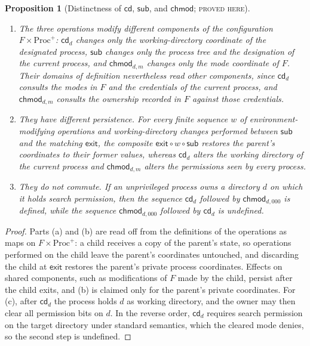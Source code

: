 \documentclass[11pt]{article}
\newtheorem{proposition}[theorem]{Proposition}
\theoremstyle{definition}
\theoremstyle{remark}
\newcommand{\stN}{\textsc{proved here}}
\begin{document}
\begin{proposition}[Distinctness of $\mathsf{cd}$, $\mathsf{sub}$, and $\mathsf{chmod}$; \stN]\label{prop:cdsubchmod}
\begin{enumerate}[label=(\alph*)]
\item The three operations modify different components of the configuration $F\times\mathrm{Proc}^{+}$: $\mathsf{cd}_d$ changes only the working-directory coordinate of the designated process, $\mathsf{sub}$ changes only the process tree and the designation of the current process, and $\mathsf{chmod}_{d,m}$ changes only the mode coordinate of $F$. Their domains of definition nevertheless read other components, since $\mathsf{cd}_d$ consults the modes in $F$ and the credentials of the current process, and $\mathsf{chmod}_{d,m}$ consults the ownership recorded in $F$ against those credentials.
\item They have different persistence. For every finite sequence $w$ of environment-modifying operations and working-directory changes performed between $\mathsf{sub}$ and the matching $\mathsf{exit}$, the composite $\mathsf{exit}\circ w\circ\mathsf{sub}$ restores the parent's coordinates to their former values, whereas $\mathsf{cd}_d$ alters the working directory of the current process and $\mathsf{chmod}_{d,m}$ alters the permissions seen by every process.
\item They do not commute. If an unprivileged process owns a directory $d$ on which it holds search permission, then the sequence $\mathsf{cd}_d$ followed by $\mathsf{chmod}_{d,000}$ is defined, while the sequence $\mathsf{chmod}_{d,000}$ followed by $\mathsf{cd}_d$ is undefined.
\end{enumerate}
\end{proposition}
\begin{proof}
Parts (a) and (b) are read off from the definitions of the operations as maps on $F\times\mathrm{Proc}^{+}$: a child receives a copy of the parent's state, so operations performed on the child leave the parent's coordinates untouched, and discarding the child at $\mathsf{exit}$ restores the parent's private process coordinates. Effects on shared components, such as modifications of $F$ made by the child, persist after the child exits, and (b) is claimed only for the parent's private coordinates. For (c), after $\mathsf{cd}_d$ the process holds $d$ as working directory, and the owner may then clear all permission bits on $d$. In the reverse order, $\mathsf{cd}_d$ requires search permission on the target directory under standard semantics, which the cleared mode denies, so the second step is undefined.
\end{proof}
\end{document}
